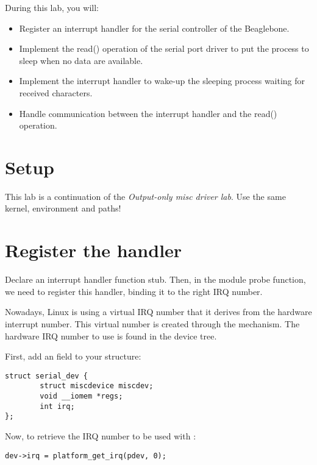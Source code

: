 
During this lab, you will:

\begin{itemize}
\item Register an interrupt handler for the serial controller of the
  Beaglebone.
\item Implement the read() operation of the serial port driver to put
  the process to sleep when no data are available.
\item Implement the interrupt handler to wake-up the sleeping process
  waiting for received characters.
\item Handle communication between the interrupt handler and the
  read() operation.
\end{itemize}

\section{Setup}

This lab is a continuation of the {\em Output-only misc driver
lab}. Use the same kernel, environment and paths!

\section{Register the handler}

Declare an interrupt handler function stub. Then, in the module probe
function, we need to register this handler, binding it to the right
IRQ number.

Nowadays, Linux is using a virtual IRQ number that it derives from the
hardware interrupt number. This virtual number is created through the
 mechanism. The hardware IRQ number to use is found in
the device tree.

First, add an  field to your  structure:

\begin{verbatim}
struct serial_dev {
        struct miscdevice miscdev;
        void __iomem *regs;
        int irq;
};
\end{verbatim}

Now, to retrieve the IRQ number to be used with :

\begin{verbatim}
dev->irq = platform_get_irq(pdev, 0);
\end{verbatim}

